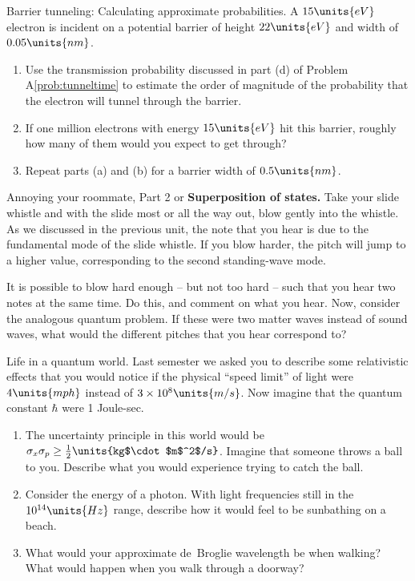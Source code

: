 \begin{aproblem}{Barrier tunneling:  Calculating approximate
probabilities.}  
  A $15\units{eV}$ electron is incident on a potential barrier of
  height $22\units{eV}$ and width of $0.05\units{nm}$.

  \begin{enumerate}
  \item Use the transmission probability discussed in part (d) of
    Problem A\ref{prob:tunneltime} to estimate the order of magnitude
    of the probability that the electron will tunnel through the
    barrier.
  \item If one million electrons with energy $15\units{eV}$ hit this
    barrier, roughly how many of them would you expect to get through?
  \item Repeat parts (a) and (b) for a barrier width of
    $0.5\units{nm}$.
  \end{enumerate}
\end{aproblem}


\begin{aproblem}{Annoying your roommate, Part 2} or {\bf Superposition
of states.} 
  Take your slide whistle and with the slide most or all the way out,
  blow gently into the whistle.  As we discussed in the previous unit,
  the note that you hear is due to the fundamental mode of the slide
  whistle.  If you blow harder, the pitch will jump to a higher value,
  corresponding to the second standing-wave mode.

  It is possible to blow hard enough -- but not too hard -- such that
  you hear two notes at the same time.  Do this, and comment on what
  you hear.  Now, consider the analogous quantum problem.  If these
  were two matter waves instead of sound waves, what would the
  different pitches that you hear correspond to?
\end{aproblem}


\begin{aproblem}{Life in a quantum world.} 
  Last semester we asked you to describe some relativistic effects
  that you would notice if the physical ``speed limit'' of light were
  $4\units{mph}$ instead of $3 \times 10^8\units{m/s}$. Now imagine
  that the quantum constant $\hbar$ were 1 Joule-sec.
  \begin{enumerate}
  \item The uncertainty principle in this world would be $\sigma_x
    \sigma_p \geq \frac{1}{2}\units{kg$\cdot$m$^2$/s}$.  Imagine that
    someone throws a ball to you. Describe what you would experience
    trying to catch the ball.
  \item Consider the energy of a photon.  With light frequencies still
    in the $10^{14}\units{Hz}$ range, describe how it would feel to be
    sunbathing on a beach.
  \item What would your approximate de~Broglie wavelength be when
    walking? What would happen when you walk through a doorway?
  \end{enumerate}
\end{aproblem}

